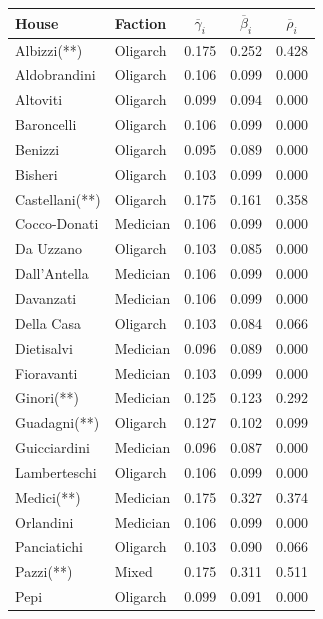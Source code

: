 \begin{table}[H]
\begin{center}
\begin{tabular}{llccc}
\toprule
House 	& Faction 	& $\overline{\gamma}_{i}$	& $\overline{\beta}_{i}$	& $\overline{\rho}_{i}$	\\
\midrule
Albizzi(**)			& Oligarch 			& 0.175			& 0.252 		& 0.428	\\
Aldobrandini		& Oligarch 			& 0.106 		& 0.099 		& 0.000	\\
Altoviti			& Oligarch 			& 0.099 		& 0.094 		& 0.000	\\
Baroncelli			& Oligarch 			& 0.106 		& 0.099 		& 0.000	\\
Benizzi				& Oligarch 			& 0.095 		& 0.089 		& 0.000	\\
Bisheri 			& Oligarch 			& 0.103 		& 0.099 		& 0.000	\\
Castellani(**)		& Oligarch 			& 0.175 		& 0.161 		& 0.358	\\
Cocco-Donati  		& Medician 			& 0.106 		& 0.099 		& 0.000	\\
Da Uzzano  			& Oligarch 			& 0.103 		& 0.085 		& 0.000	\\
Dall'Antella 		& Medician 			& 0.106 		& 0.099 		& 0.000	\\
Davanzati   		& Medician 			& 0.106 		& 0.099 		& 0.000	\\
Della Casa  		& Oligarch 			& 0.103 		& 0.084 		& 0.066	\\
Dietisalvi 			& Medician 			& 0.096 		& 0.089 		& 0.000	\\
Fioravanti  		& Medician 			& 0.103 		& 0.099 		& 0.000	\\
Ginori(**)  		& Medician 			& 0.125 		& 0.123 		& 0.292	\\
Guadagni(**)  		& Oligarch 			& 0.127 		& 0.102 		& 0.099	\\
Guicciardini 		& Medician 			& 0.096 		& 0.087 		& 0.000	\\
Lamberteschi		& Oligarch 			& 0.106 		& 0.099 		& 0.000	\\
Medici(**)   		& Medician 			& 0.175 		& 0.327 		& 0.374	\\
Orlandini  			& Medician 			& 0.106 		& 0.099 		& 0.000	\\
Panciatichi 		& Oligarch 			& 0.103 		& 0.090 		& 0.066	\\
Pazzi(**)   		& Mixed 			& 0.175 		& 0.311 		& 0.511	\\
Pepi        		& Oligarch 			& 0.099 		& 0.091 		& 0.000	\\

\end{tabular}
\end{center}
\end{table}
